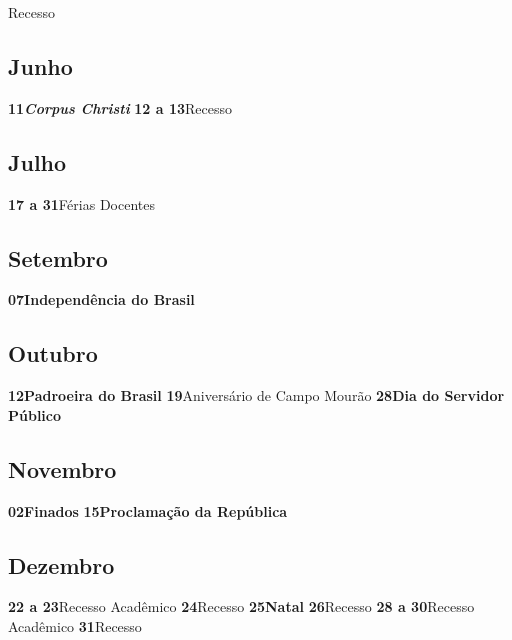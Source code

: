 \documentclass[thesis]{hmcposter}
\begin{document}
\begin{poster}
\quad \quad \quad Recesso \newline\subsection{Junho}\textbf{11}\quad \quad \quad \quad \textbf{\textit{Corpus Christi}} \newline\textbf{12 a 13}\quad \quad Recesso \newline\subsection{Julho}\textbf{17 a 31}\quad \quad Férias Docentes \newline\subsection{Setembro}\textbf{07}\quad \quad \quad \quad \textbf{Independência do Brasil} \newline\subsection{Outubro}\textbf{12}\quad \quad \quad \quad \textbf{Padroeira do Brasil} \newline\textbf{19}\quad \quad \quad \quad Aniversário de Campo Mourão \newline\textbf{28}\quad \quad \quad \quad \textbf{Dia do Servidor Público} \newline\subsection{Novembro}\textbf{02}\quad \quad \quad \quad \textbf{Finados} \newline\textbf{15}\quad \quad \quad \quad \textbf{Proclamação da República} \newline\subsection{Dezembro}\textbf{22 a 23}\quad \quad Recesso Acadêmico \newline\textbf{24}\quad \quad \quad \quad Recesso \newline\textbf{25}\quad \quad \quad \quad \textbf{Natal} \newline\textbf{26}\quad \quad \quad \quad Recesso \newline\textbf{28 a 30}\quad \quad Recesso Acadêmico \newline\textbf{31}\quad \quad \quad \quad Recesso \newline\newpage

\end{poster}
\end{document}
